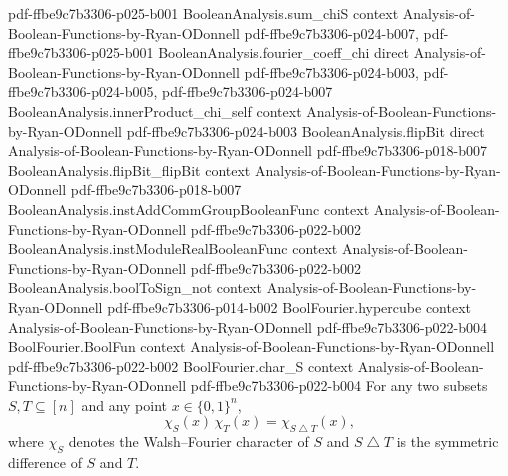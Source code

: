 \begin{lemma}
  {pdf-ffbe9c7b3306-p025-b001}
\proofstep
  {BooleanAnalysis.sum_chiS}
  {context}
  {Analysis-of-Boolean-Functions-by-Ryan-ODonnell}
  {pdf-ffbe9c7b3306-p024-b007,
    pdf-ffbe9c7b3306-p025-b001}
\proofstep
  {BooleanAnalysis.fourier_coeff_chi}
  {direct}
  {Analysis-of-Boolean-Functions-by-Ryan-ODonnell}
  {pdf-ffbe9c7b3306-p024-b003,
    pdf-ffbe9c7b3306-p024-b005,
    pdf-ffbe9c7b3306-p024-b007}
\proofstep
  {BooleanAnalysis.innerProduct_chi_self}
  {context}
  {Analysis-of-Boolean-Functions-by-Ryan-ODonnell}
  {pdf-ffbe9c7b3306-p024-b003}
\proofstep
  {BooleanAnalysis.flipBit}
  {direct}
  {Analysis-of-Boolean-Functions-by-Ryan-ODonnell}
  {pdf-ffbe9c7b3306-p018-b007}
\proofstep
  {BooleanAnalysis.flipBit_flipBit}
  {context}
  {Analysis-of-Boolean-Functions-by-Ryan-ODonnell}
  {pdf-ffbe9c7b3306-p018-b007}
\proofstep
  {BooleanAnalysis.instAddCommGroupBooleanFunc}
  {context}
  {Analysis-of-Boolean-Functions-by-Ryan-ODonnell}
  {pdf-ffbe9c7b3306-p022-b002}
\proofstep
  {BooleanAnalysis.instModuleRealBooleanFunc}
  {context}
  {Analysis-of-Boolean-Functions-by-Ryan-ODonnell}
  {pdf-ffbe9c7b3306-p022-b002}
\proofstep
  {BooleanAnalysis.boolToSign_not}
  {context}
  {Analysis-of-Boolean-Functions-by-Ryan-ODonnell}
  {pdf-ffbe9c7b3306-p014-b002}
\proofstep
  {BoolFourier.hypercube}
  {context}
  {Analysis-of-Boolean-Functions-by-Ryan-ODonnell}
  {pdf-ffbe9c7b3306-p022-b004}
\proofstep
  {BoolFourier.BoolFun}
  {context}
  {Analysis-of-Boolean-Functions-by-Ryan-ODonnell}
  {pdf-ffbe9c7b3306-p022-b002}
\proofstep
  {BoolFourier.char_S}
  {context}
  {Analysis-of-Boolean-Functions-by-Ryan-ODonnell}
  {pdf-ffbe9c7b3306-p022-b004}
For any two subsets $S, T \subseteq [n]$ and any point $x \in \{0,1\}^n$,
\[
  \chi_S(x)\,\chi_T(x) = \chi_{S \mathbin{\triangle} T}(x),
\]
where $\chi_S$ denotes the Walsh--Fourier character of $S$ and $S \mathbin{\triangle} T$
is the symmetric difference of $S$ and $T$.
\end{lemma}

